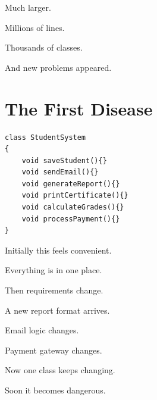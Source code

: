 \documentclass[11pt,a4paper]{book}
\begin{document}

Much larger.


Millions of lines.


Thousands of classes.


And new problems appeared.


\section{The First Disease}

\begin{verbatim}
class StudentSystem
{
    void saveStudent(){}
    void sendEmail(){}
    void generateReport(){}
    void printCertificate(){}
    void calculateGrades(){}
    void processPayment(){}
}
\end{verbatim}

Initially this feels convenient.


Everything is in one place.


Then requirements change.


A new report format arrives.


Email logic changes.


Payment gateway changes.


Now one class keeps changing.


Soon it becomes dangerous.

\end{document}

